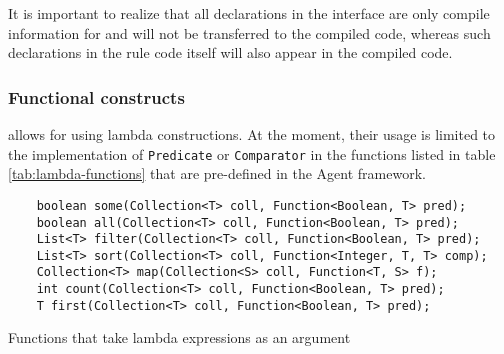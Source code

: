 It is important to realize that all declarations in the interface are only compile information for \vonda and will not be transferred to the compiled code, whereas such declarations in the rule code itself will also appear in the compiled code.



\subsubsection{Functional constructs}


\vonda allows for using lambda constructions. At the moment, their usage is limited to the implementation of \texttt{Predicate} or \texttt{Comparator} in the functions
 listed in table \ref{tab:lambda-functions} that are pre-defined in the Agent framework.

\begin{table}[htbp]
  \centering
  \begin{small}
	\begin{lstlisting}
	boolean some(Collection<T> coll, Function<Boolean, T> pred);
	boolean all(Collection<T> coll, Function<Boolean, T> pred);
	List<T> filter(Collection<T> coll, Function<Boolean, T> pred);
	List<T> sort(Collection<T> coll, Function<Integer, T, T> comp);
	Collection<T> map(Collection<S> coll, Function<T, S> f);
	int count(Collection<T> coll, Function<Boolean, T> pred);
	T first(Collection<T> coll, Function<Boolean, T> pred);
	\end{lstlisting}
  \end{small}

  \caption{Functions that take lambda expressions as an argument}
  \label{tab:lambda-functions}
\end{table}

